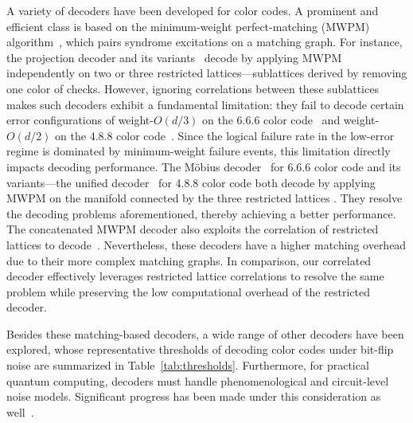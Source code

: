 \documentclass[%
 reprint,
 amsmath,amssymb,
 aps,
]{revtex4-2}
\begin{document}
A variety of decoders have been developed for color codes. A prominent and efficient class is based on the minimum-weight perfect-matching (MWPM) algorithm~\cite{edmonds1965paths,wu2023fusion,higgott2025sparse, higgott2022pymatching}, which pairs syndrome excitations on a matching graph. For instance, the projection decoder and its variants~\cite{delfosse2014decoding_cc, chamberland2020triangular, kubica2023efficient} decode by applying MWPM independently on two or three restricted lattices---sublattices derived by removing one color of checks. However, ignoring correlations between these sublattices makes such decoders exhibit a fundamental limitation: they fail to decode certain error configurations of weight-$O(d/3)$ on the 6.6.6 color code~\cite{delfosse2014decoding_cc, sahay2022decoder} and weight-$O(d/2)$ on the 4.8.8 color code~\cite{benhemou2025minimising}. Since the logical failure rate in the low-error regime is dominated by minimum-weight failure events, this limitation directly impacts decoding performance.
 The M{\"o}bius decoder~\cite{sahay2022decoder} for 6.6.6 color code and its variants---the unified decoder~\cite{benhemou2025minimising} for 4.8.8 color code both decode by applying MWPM on the manifold connected by the three restricted lattices 
 . They resolve the decoding problems aforementioned, thereby achieving a better performance. The concatenated MWPM decoder also exploits the correlation of restricted lattices to decode~\cite{lee2025color}. Nevertheless, these decoders have a higher matching overhead due to their more complex matching graphs. In comparison, our correlated decoder effectively leverages restricted lattice correlations to resolve the same problem while preserving the low computational overhead of the restricted decoder.
 
 Besides these matching-based decoders, a wide range of other decoders have been explored, whose representative thresholds of decoding color codes under bit-flip noise are summarized in Table~\ref{tab:thresholds}. Furthermore, for practical quantum computing, decoders must handle phenomenological and circuit-level noise models. Significant progress has been made under this consideration as well~\cite{gidney2023new, lee2025color, koutsioumpas2025colour, landahl2011fault, wu2025minimum, beni2025tesseract}.
\end{document}
